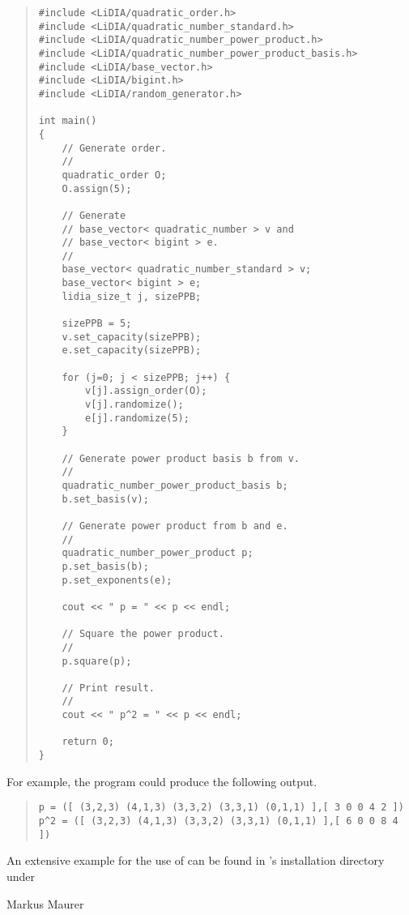 \begin{quote}
\begin{verbatim}
#include <LiDIA/quadratic_order.h>
#include <LiDIA/quadratic_number_standard.h>
#include <LiDIA/quadratic_number_power_product.h>
#include <LiDIA/quadratic_number_power_product_basis.h>
#include <LiDIA/base_vector.h>
#include <LiDIA/bigint.h>
#include <LiDIA/random_generator.h>

int main()
{
    // Generate order.
    //
    quadratic_order O;
    O.assign(5);

    // Generate
    // base_vector< quadratic_number > v and
    // base_vector< bigint > e.
    //
    base_vector< quadratic_number_standard > v;
    base_vector< bigint > e;
    lidia_size_t j, sizePPB;

    sizePPB = 5;
    v.set_capacity(sizePPB);
    e.set_capacity(sizePPB);

    for (j=0; j < sizePPB; j++) {
        v[j].assign_order(O);
        v[j].randomize();
        e[j].randomize(5);
    }

    // Generate power product basis b from v.
    //
    quadratic_number_power_product_basis b;
    b.set_basis(v);

    // Generate power product from b and e.
    //
    quadratic_number_power_product p;
    p.set_basis(b);
    p.set_exponents(e);

    cout << " p = " << p << endl;

    // Square the power product.
    //
    p.square(p);

    // Print result.
    //
    cout << " p^2 = " << p << endl;

    return 0;
}
\end{verbatim}
\end{quote}

For example, the program could produce the following output.
\begin{quote}
\begin{verbatim}
p = ([ (3,2,3) (4,1,3) (3,3,2) (3,3,1) (0,1,1) ],[ 3 0 0 4 2 ])
p^2 = ([ (3,2,3) (4,1,3) (3,3,2) (3,3,1) (0,1,1) ],[ 6 0 0 8 4 ])
\end{verbatim}
\end{quote}

An extensive example for the use of  can be found in
\LiDIA's installation directory under



\AUTHOR

Markus Maurer

